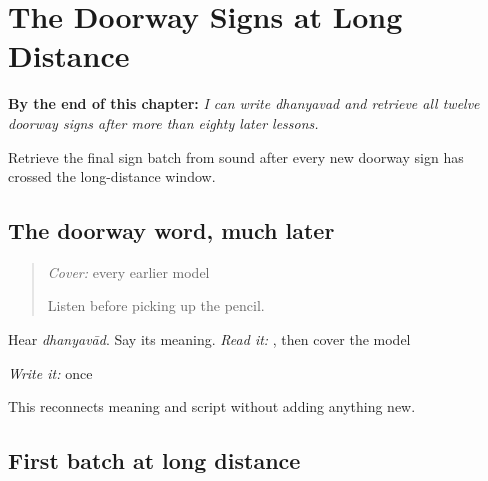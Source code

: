 
\chapter{The Doorway Signs at Long Distance}
\label{ch:doorway-script-distance}

\begin{chapteropening}
\textbf{By the end of this chapter:} \emph{I can write dhanyavad and retrieve all twelve doorway signs after more than eighty later lessons.}

Retrieve the final sign batch from sound after every new doorway sign has crossed the long-distance window.
\end{chapteropening}

\section[\texorpdfstring{\mr{धन्यवाद} (dhanyavād)}{धन्यवाद (dhanyavād)}]{The doorway word, much later}

\label{lesson:MR-R18-script-warmup}



\begin{quote}
\emph{Cover:} every earlier model

Listen before picking up the pencil.
\end{quote}

\begin{tcolorbox}[breakable,colback=teal!4,colframe=teal!35!black,title={Before you move on}]
Hear \emph{dhanyavād}. Say its meaning. \emph{Read it:} \textbf{}, then cover the model

\emph{Write it:} \textbf{} once

This reconnects meaning and script without adding anything new.
\end{tcolorbox}
\section[\texorpdfstring{\mr{ः} / \mr{आ} / \mr{भ} (visarga / aa / bha)}{ः / आ / भ (visarga / aa / bha)}]{First batch at long distance}

